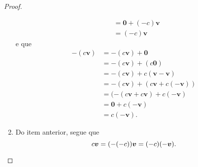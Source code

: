 \begin{proof}
\begin{enumerate}
\begin{align*}
			&= \bm 0 + (-c) \bm v \\
			&= (-c) \bm v
		\end{align*}
e que
		\begin{align*}
		-(c\bm{v}) &= -(c\bm{v}) + \bm 0 \\
			&= -(c\bm v) + (c \bm 0) \\
			&= -(c\bm v) + c(\bm v - \bm v) \\
			&= -(c\bm v) + (c\bm v + c(- \bm v)) \\
			&= (-(c\bm v + c\bm v) + c(- \bm v) \\
			&= \bm 0 + c(- \bm v) \\
			&= c(- \bm v).
		\end{align*}
	\item Do item anterior, segue que
		\begin{equation*}
		c\bm v = (-(-c))\bm v = (-c)(- \bm v).  \qedhere
		\end{equation*}
	\end{enumerate}
\end{proof}

